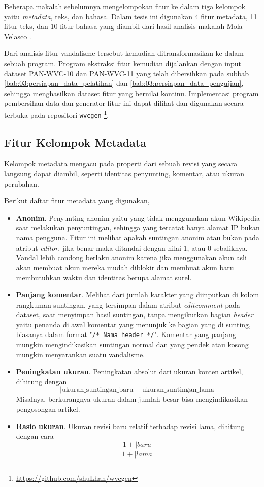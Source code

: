 Beberapa makalah sebelumnya mengelompokan fitur ke dalam tiga kelompok yaitu
\textit{metadata}, teks, dan bahasa.
Dalam tesis ini digunakan 4 fitur metadata, 11 fitur teks, dan 10 fitur
bahasa yang diambil dari hasil analisis makalah Mola-Velasco
\cite{mola2012wikipedia}.

Dari analisis fitur vandalisme tersebut kemudian ditransformasikan ke dalam
sebuah program.
Program ekstraksi fitur kemudian dijalankan dengan input dataset PAN-WVC-10
dan PAN-WVC-11 yang telah dibersihkan pada subbab
\ref{bab:03:persiapan_data_pelatihan} dan
\ref{bab:03:persiapan_data_pengujian},
sehingga menghasilkan dataset fitur yang bernilai kontinu.
Implementasi program pembersihan data dan generator fitur ini dapat dilihat dan
digunakan secara terbuka pada repositori \texttt{wvcgen}
\footnote{\url{https://github.com/shuLhan/wvcgen}}.

\subsection{Fitur Kelompok Metadata}

Kelompok metadata mengacu pada properti dari sebuah revisi yang secara langsung
dapat diambil, seperti identitas penyunting, komentar, atau ukuran perubahan.

Berikut daftar fitur metadata yang digunakan,

\begin{itemize}

\item \textbf{Anonim}.
Penyunting anonim yaitu yang tidak menggunakan akun Wikipedia saat melakukan
penyuntingan, sehingga yang tercatat hanya alamat IP bukan nama pengguna.
Fitur ini melihat apakah suntingan anonim atau bukan pada atribut
\textit{editor}, jika benar maka ditandai dengan nilai 1, atau 0 sebaliknya.
Vandal lebih condong berlaku anonim karena jika menggunakan akun asli akan
membuat akun mereka mudah diblokir dan membuat akun baru membutuhkan waktu dan
identitas berupa alamat surel.

\item \textbf{Panjang komentar}.
Melihat dari jumlah karakter yang diinputkan di kolom rangkuman suntingan, yang
tersimpan dalam atribut \textit{editcomment} pada dataset, saat menyimpan hasil
suntingan, tanpa mengikutkan bagian \textit{header} yaitu penanda di awal
komentar yang menunjuk ke bagian yang di sunting, biasanya dalam format
"\texttt{/* Nama header */}".
Komentar yang panjang mungkin mengindikasikan suntingan normal dan yang pendek
atau kosong mungkin menyarankan suatu vandalisme.

\item \textbf{Peningkatan ukuran}.
Peningkatan absolut dari ukuran konten artikel, dihitung dengan
\[
|\text{ukuran\_suntingan\_baru} - \text{ukuran\_suntingan\_lama}|
\]
Misalnya, berkurangnya ukuran dalam jumlah besar bisa mengindikasikan
pengosongan artikel.

\item \textbf{Rasio ukuran}.
Ukuran revisi baru relatif terhadap revisi lama, dihitung dengan cara
\[
\frac{1 + |baru|}{1 + |lama|}
\]

\end{itemize}


